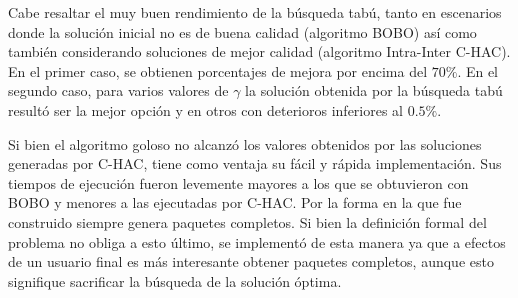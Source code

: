 Cabe resaltar el muy buen rendimiento de la búsqueda tabú, tanto en escenarios donde la solución inicial no es de buena calidad (algoritmo BOBO) así como también considerando soluciones de mejor calidad (algoritmo Intra-Inter C-HAC). En el primer caso, se obtienen porcentajes de mejora por encima del $70\%$. En el segundo caso, para varios valores de $\gamma$ la solución obtenida por la búsqueda tabú resultó ser la mejor opción y en otros con deterioros inferiores al $0.5\%$.

Si bien el algoritmo goloso no alcanzó los valores obtenidos por las soluciones generadas por C-HAC, tiene como ventaja su fácil y rápida implementación. Sus tiempos de ejecución fueron levemente mayores a los que se obtuvieron con BOBO y menores a las ejecutadas por C-HAC. Por la forma en la que fue construido siempre genera paquetes completos. Si bien la definición formal del problema no obliga a esto último, se implementó de esta manera ya que a efectos de un usuario final es más interesante obtener paquetes completos, aunque esto signifique sacrificar la búsqueda de la solución óptima.

\begin{table}[H]
\begin{center}
\caption{Comparación de calidad de soluciones entre algoritmos para la \hyperref[busqueda:articulos]{búsqueda de artículos}}
\end{center}
\end{table}

